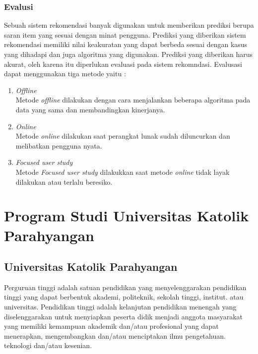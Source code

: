 \subsubsection{Evalusi}
Sebuah sistem rekomendasi banyak digunakan untuk memberikan prediksi berupa saran item yang sesuai dengan minat pengguna. Prediksi yang diberikan sistem rekomendasi memiliki nilai keakuratan yang dapat berbeda sesuai dengan kasus yang dihadapi dan juga algoritma yang digunakan. Prediksi yang diberikan harus akurat, oleh karena itu diperlukan evaluasi pada sistem rekomndasi. Evalusasi dapat menggunakan tiga metode yaitu :

\begin{enumerate}
	\item \textit{Offline}\\
		Metode \textit{offline} dilakukan dengan cara menjalankan beberapa algoritma pada data yang sama dan membandingkan kinerjanya.

	\item \textit{Online}\\
		Metode \textit{online} dilakukan saat perangkat lunak sudah diluncurkan dan melibatkan pengguna nyata. 
		
	\item \textit{Focused user study}\\
		Metode \textit{Focused user study} dilakukkan saat metode \textit{online} tidak layak dilakukan atau terlalu beresiko.
	
\end{enumerate}


\section{Program Studi Universitas Katolik Parahyangan}

\subsection{Universitas Katolik Parahyangan}
Perguruan tinggi adalah satuan pendidikan yang menyelenggarakan pendidikan tinggi yang dapat berbentuk akademi, politeknik, sekolah tinggi, institut. atau universitas. Pendidikan tinggi adalah kelanjutan pendidikan menengah yang
diselenggarakan untuk menyiapkan peserta didik menjadi anggota masyarakat yang memiliki kemampuan akademik dan/atau profesional yang dapat menerapkan, mengembangkan dan/atau menciptakan ilmu pengetahuan. teknologi dan/atau kesenian. \\ %


